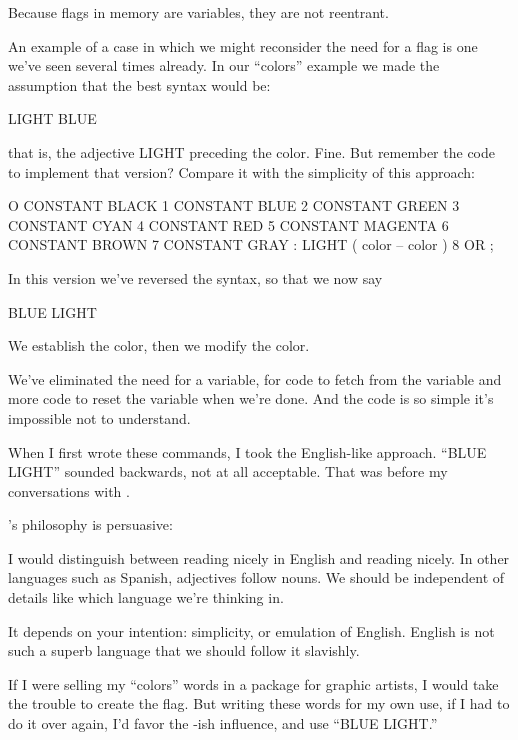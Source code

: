 Because flags in memory are variables, they are not reentrant.

An example of a case in which we might reconsider the need for a
flag is one we've seen several times already. In our ``colors'' example we
made the assumption that the best syntax would be:

\begin{Code}
LIGHT BLUE
\end{Code}
that is, the adjective LIGHT preceding the color. Fine. But remember the
code to implement that version? Compare it with the simplicity of this
approach:

\begin{Code}
O CONSTANT BLACK    1 CONSTANT BLUE    2 CONSTANT GREEN
3 CONSTANT CYAN     4 CONSTANT RED     5 CONSTANT MAGENTA
6 CONSTANT BROWN    7 CONSTANT GRAY
: LIGHT   ( color -- color )  8 OR ;
\end{Code}
In this version we've reversed the syntax, so that we now say

\begin{Code}
BLUE LIGHT
\end{Code}
We establish the color, then we modify the color.

We've eliminated the need for a variable, for code to fetch from the
variable and more code to reset the variable when we're done. And the
code is so simple it's impossible not to understand.

When I first wrote these commands, I took the English-like approach.
``BLUE LIGHT'' sounded backwards, not at all acceptable. That
was before my conversations with .

\begin{interview}
's philosophy is persuasive:
\begin{tfquot}
I would distinguish between reading nicely in English and reading nicely.
In other languages such as Spanish, adjectives follow nouns. We should be
independent of details like which language we're thinking in.

It depends on your intention: simplicity, or emulation of English. English is
not such a superb language that we should follow it slavishly.
\end{tfquot}
\end{interview}
If I were selling my ``colors'' words in a package for graphic artists, I
would take the trouble to create the flag. But writing these words for my
own use, if I had to do it over again, I'd favor the -ish influence,
and use ``BLUE LIGHT.''

